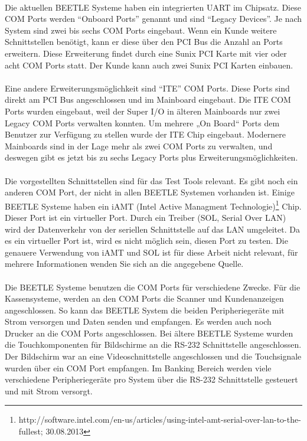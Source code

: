 \paragraph{}
Die aktuellen BEETLE Systeme haben ein integrierten UART im Chipsatz. Diese COM Ports werden "`Onboard Ports"' genannt und sind "`Legacy Devices"'. Je nach System sind zwei bis sechs COM Ports eingebaut. Wenn ein Kunde weitere Schnittstellen benötigt, kann er diese über den PCI Bus die Anzahl an Ports erweitern. Diese Erweiterung findet durch eine Sunix PCI Karte mit vier oder acht COM Ports statt. Der Kunde kann auch zwei Sunix PCI Karten einbauen.
\\\\
Eine andere Erweiterungsmöglichkeit sind "`ITE"' COM Ports. Diese Ports sind direkt am PCI Bus angeschlossen und im Mainboard eingebaut. Die ITE COM Ports wurden eingebaut, weil der Super I/O in älteren Mainboards nur zwei Legacy COM Ports verwalten konnten. Um mehrere „On Board“ Ports dem Benutzer zur Verfügung zu stellen wurde der ITE Chip eingebaut. Modernere Mainboards sind in der Lage mehr als zwei COM Ports zu verwalten, und deswegen gibt es jetzt bis zu sechs Legacy Ports plus Erweiterungsmöglichkeiten.
\\\\
Die vorgestellten Schnittstellen sind für das Test Tools relevant. Es gibt noch ein anderen COM Port, der nicht in allen BEETLE Systemen vorhanden ist. Einige BEETLE Systeme haben ein iAMT (Intel Active Managment Technologie)\footnote{http://software.intel.com/en-us/articles/using-intel-amt-serial-over-lan-to-the-fullest; 30.08.2013} Chip. Dieser Port ist ein virtueller Port. Durch ein Treiber (SOL, Serial Over LAN) wird der Datenverkehr von der seriellen Schnittstelle auf das LAN umgeleitet. Da es ein virtueller Port ist, wird es nicht möglich sein, diesen Port zu testen. Die genauere Verwendung von iAMT und SOL ist für diese Arbeit nicht relevant, für mehrere Informationen wenden Sie sich an die angegebene Quelle.
\\\\
Die BEETLE Systeme benutzen die COM Ports für verschiedene Zwecke. Für die Kassensysteme, werden an den COM Ports die Scanner und Kundenanzeigen angeschlossen. So kann das BEETLE System die beiden Peripheriegeräte mit Strom versorgen und Daten senden und empfangen. Es werden auch noch Drucker an die COM Ports angeschlossen. Bei ältere BEETLE Systeme wurden die Touchkomponenten für Bildschirme an die RS-232 Schnittstelle angeschlossen. Der Bildschirm war an eine Videoschnittstelle angeschlossen und die Touchsignale wurden über ein COM Port empfangen. Im Banking Bereich werden viele verschiedene Peripheriegeräte pro System über die RS-232 Schnittstelle gesteuert und mit Strom versorgt.




